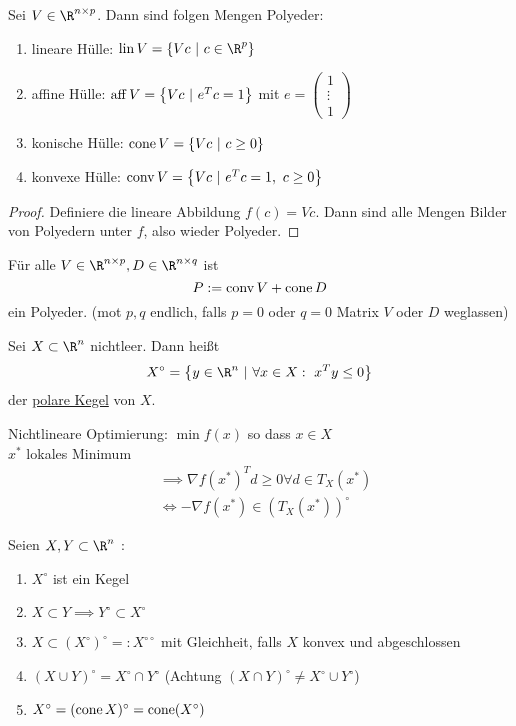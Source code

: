 \begin{lemma}
	Sei $V \in \R^{n \times p}$. Dann sind folgen Mengen Polyeder:
	\begin{enumerate}[label = (\alph*)]
		\item lineare Hülle: $\lin V = \left\{ Vc\ |\ c \in \R^p \right\}$ 
		\item affine Hülle: $\aff V = \left\{ Vc\ |\ e^{T} c =1 \right\}$ mit $e  = 
				\begin{pmatrix}
					1 \\
					\vdots \\ 
					1
				\end{pmatrix}$
		\item konische Hülle: $\cone V = \left\{ Vc\ |\ c \geq 0 \right\}$ 
		\item konvexe Hülle: $\conv V = \left\{ Vc\ |\ e^{T} c =1,\ c \geq 0  \right\}$ 
	\end{enumerate}
\end{lemma}
\begin{proof}
	Definiere die lineare Abbildung $f(c) = Vc$.
	Dann sind alle Mengen Bilder von Polyedern unter $f$, also wieder Polyeder.
\end{proof}
\begin{korollar}
	Für alle $V \in \R^{n \times p}, D \in \R^{n\times q}$ ist 
	\begin{equation*}
		P := \operatorname{conv} V + \operatorname{cone} D
	\end{equation*}
	ein Polyeder. (mot $p,q$ endlich, falls $p=0$ oder $q=0$ Matrix $V$ oder $D$ weglassen)
\end{korollar}
\begin{definition}
	Sei $X \subset \R^n$ nichtleer. Dann heißt
	\begin{equation*}
		X^\circ= \left\{ y \in \R^n\ |\ \forall x \in X:\ x^{T} y \leq 0 \right\}
	\end{equation*}
	der \underline{polare Kegel} von $X$.
\end{definition}
Nichtlineare Optimierung: $\min f(x)$ so dass $x\in X$ \\
$x^*$ lokales Minimum 
\begin{align*}
	&\implies \nabla f(x^*)^{T} d \geq 0 \forall d \in T_{X}(x^*)\\
	&\iff - \nabla f(x^*) \in \left( T_{X}(x^*) \right)^\circ
\end{align*}
\begin{lemma}
	Seien $X,Y \subset \R^n$ :
	\begin{enumerate}[label = (\alph*)]
		\item $X^\circ$ ist ein Kegel
		\item $X \subset Y \implies Y^\circ \subset X^\circ$
		\item $X \subset  \left( X^\circ \right)^\circ=: X^{\circ\circ}$ mit Gleichheit, falls $X$ konvex und abgeschlossen
		\item $\left( X \cup Y \right)^\circ = X^\circ \cap Y^\circ$ (Achtung $\left( X \cap Y \right)^\circ \neq X^\circ\cup Y^\circ$)
		\item $X^\circ = (\operatorname{cone} X)^\circ = \operatorname{cone}(X^\circ)$
	\end{enumerate}
\end{lemma}
